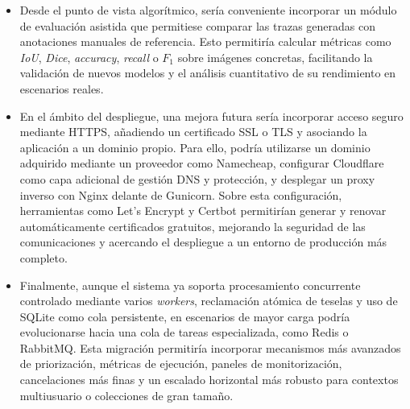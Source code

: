 \begin{itemize}
	\item Desde el punto de vista algorítmico, sería conveniente incorporar un módulo de evaluación asistida que permitiese comparar las trazas generadas con anotaciones manuales de referencia. Esto permitiría calcular métricas como \textit{IoU}, \textit{Dice}, \textit{accuracy}, \textit{recall} o $F_1$ sobre imágenes concretas, facilitando la validación de nuevos modelos y el análisis cuantitativo de su rendimiento en escenarios reales.
	
	\item En el ámbito del despliegue, una mejora futura sería incorporar acceso seguro mediante HTTPS, añadiendo un certificado SSL o TLS y asociando la aplicación a un dominio propio. Para ello, podría utilizarse un dominio adquirido mediante un proveedor como Namecheap, configurar Cloudflare como capa adicional de gestión DNS y protección, y desplegar un proxy inverso con Nginx delante de Gunicorn. Sobre esta configuración, herramientas como Let’s Encrypt y Certbot permitirían generar y renovar automáticamente certificados gratuitos, mejorando la seguridad de las comunicaciones y acercando el despliegue a un entorno de producción más completo.
	
	\item Finalmente, aunque el sistema ya soporta procesamiento concurrente controlado mediante varios \textit{workers}, reclamación atómica de teselas y uso de SQLite como cola persistente, en escenarios de mayor carga podría evolucionarse hacia una cola de tareas especializada, como Redis o RabbitMQ. Esta migración permitiría incorporar mecanismos más avanzados de priorización, métricas de ejecución, paneles de monitorización, cancelaciones más finas y un escalado horizontal más robusto para contextos multiusuario o colecciones de gran tamaño.
\end{itemize}
